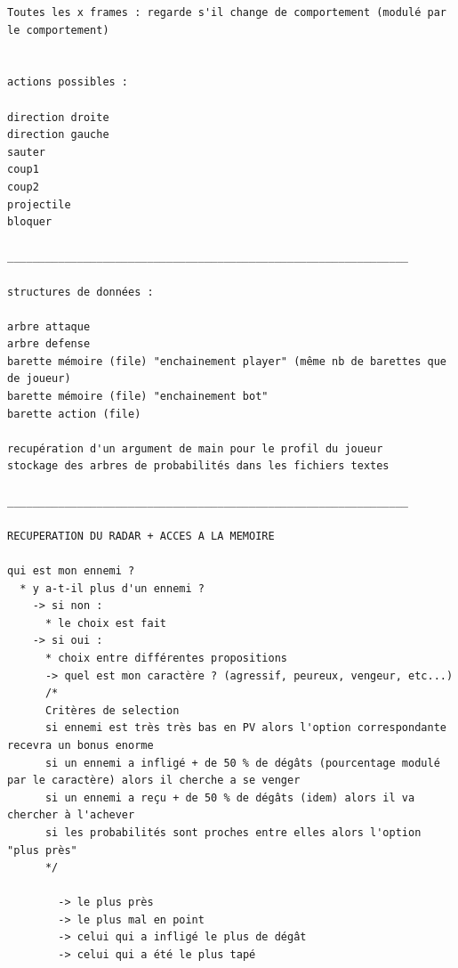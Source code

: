 \begin{scriptsize}
\begin{verbatim}
Toutes les x frames : regarde s'il change de comportement (modulé par le comportement)


actions possibles :

direction droite
direction gauche
sauter
coup1
coup2
projectile
bloquer

_______________________________________________________________

structures de données :

arbre attaque
arbre defense
barette mémoire (file) "enchainement player" (même nb de barettes que de joueur)  
barette mémoire (file) "enchainement bot"
barette action (file)

recupération d'un argument de main pour le profil du joueur
stockage des arbres de probabilités dans les fichiers textes

_______________________________________________________________

RECUPERATION DU RADAR + ACCES A LA MEMOIRE

qui est mon ennemi ?
  * y a-t-il plus d'un ennemi ?
    -> si non : 
      * le choix est fait
    -> si oui : 
      * choix entre différentes propositions
      -> quel est mon caractère ? (agressif, peureux, vengeur, etc...)
      /*
      Critères de selection
      si ennemi est très très bas en PV alors l'option correspondante recevra un bonus enorme
      si un ennemi a infligé + de 50 % de dégâts (pourcentage modulé par le caractère) alors il cherche a se venger
      si un ennemi a reçu + de 50 % de dégâts (idem) alors il va chercher à l'achever
      si les probabilités sont proches entre elles alors l'option "plus près" 
      */
	
        -> le plus près
        -> le plus mal en point
        -> celui qui a infligé le plus de dégât
        -> celui qui a été le plus tapé


\end{verbatim}
\end{scriptsize}
